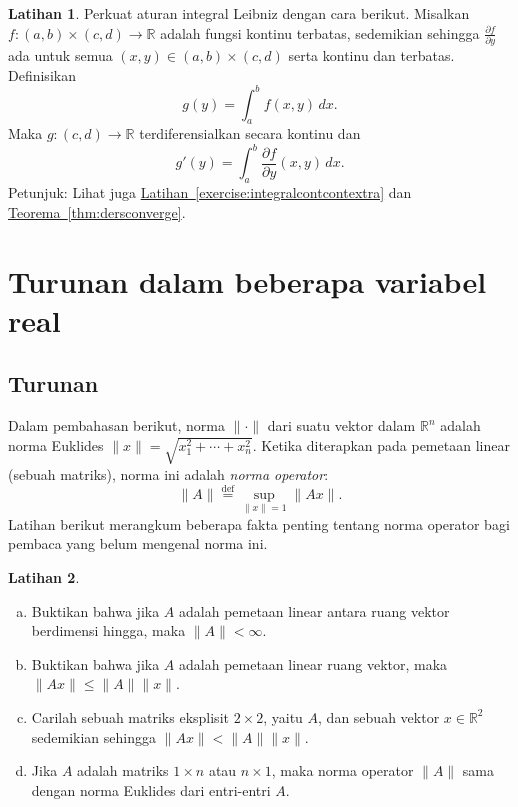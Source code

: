 \documentclass[12pt,openany]{book}
\newcommand{\snorm}[1]{\lVert {#1} \rVert}
\newcommand{\R}{{\mathbb{R}}}
\newcommand{\myindex}[1]{#1\index{#1}}
\theoremstyle{plain}
\theoremstyle{remark}
\theoremstyle{definition}
\newenvironment{exbox}{%
    \def\FrameCommand{\vrule width 1pt \relax\hspace{10pt}}%
    \MakeFramed{\advance\hsize-\width\FrameRestore}%
}{%
    \endMakeFramed
}
\newenvironment{exparts}{%
    \leavevmode\begin{enumerate}[a),noitemsep,topsep=0pt,parsep=0pt,partopsep=0pt]
}{%
    \end{enumerate}
}
\theoremstyle{exercise}
\newtheorem{exercise}{Latihan}[section]
\theoremstyle{example}
\newcommand{\exerciseref}[1]{\hyperref[#1]{Latihan~\ref*{#1}}}
\newcommand{\thmref}[1]{\hyperref[#1]{Teorema~\ref*{#1}}}
\begin{document}
\begin{exbox}
\begin{exercise} \label{exercise:strongerleibniz}
Perkuat aturan integral Leibniz dengan cara berikut.
Misalkan $f \colon (a,b) \times (c,d) \to \R$ adalah fungsi kontinu terbatas,
sedemikian sehingga $\frac{\partial f}{\partial y}$ ada untuk semua $(x,y) \in (a,b)
\times (c,d)$ serta kontinu dan terbatas.  Definisikan
\begin{equation*}
g(y) = \int_a^b f(x,y) \,dx .
\end{equation*}
Maka $g \colon (c,d) \to \R$ terdiferensialkan secara kontinu dan
\begin{equation*}
g'(y) = \int_a^b \frac{\partial f}{\partial y}(x,y) \,dx .
\end{equation*}
Petunjuk: Lihat juga \exerciseref{exercise:integralcontcontextra} dan
\thmref{thm:dersconverge}.
\end{exercise}
\end{exbox}


\section{Turunan dalam beberapa variabel real} \label{sec:derinsv}

\subsection{Turunan}

Dalam pembahasan berikut, norma $\snorm{\cdot}$ dari suatu vektor dalam $\R^n$
adalah norma Euklides
%
$\snorm{x} = \sqrt{x_1^2+\cdots+x_n^2}$.
Ketika diterapkan pada pemetaan linear (sebuah matriks), norma ini adalah
%
\emph{\myindex{norma operator}}:
\begin{equation*}
\snorm{A} \overset{\text{def}}{=} \sup_{\snorm{x} = 1} \snorm{Ax} .
\end{equation*}
Latihan berikut merangkum beberapa fakta penting tentang norma operator
bagi pembaca yang belum mengenal norma ini.

\begin{exbox}
\begin{exercise}
\begin{exparts} 
\item
Buktikan bahwa jika $A$ adalah pemetaan linear antara ruang vektor
berdimensi hingga, maka $\snorm{A} < \infty$.
\item
Buktikan bahwa jika $A$ adalah pemetaan linear ruang vektor, maka
$\snorm{Ax} \leq \snorm{A} \snorm{x}$.
\item
Carilah sebuah matriks eksplisit $2 \times 2$, yaitu $A$, dan sebuah vektor $x \in \R^2$
sedemikian sehingga $\snorm{Ax} < \snorm{A} \snorm{x}$.
\item
Jika $A$ adalah matriks $1 \times n$ atau $n \times 1$, maka norma operator
$\snorm{A}$ sama dengan norma Euklides dari entri-entri $A$.
\end{exparts} 
\end{exercise}
\end{exbox}
\end{document}
